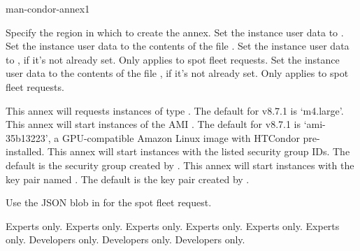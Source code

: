 \begin{ManPage}{}{man-condor-annex}{1}
\begin{Options}
		{Specify the region in which to create the annex.}
		{Set the instance user data to .}
		{Set the instance user data to the contents of the file .}
		{Set the instance user data to , if it's not already set.  Only applies to spot fleet requests.}
		{Set the instance user data to the contents of the file , if it's not already set.  Only applies to spot fleet requests.}

		{This annex will requests instances of type .  The default for v8.7.1 is `m4.large'.}
		{This annex will start instances of the AMI .  The default for v8.7.1 is `ami-35b13223', a GPU-compatible Amazon Linux image with HTCondor pre-installed.}
		{This annex will start instances with the listed security group IDs.  The default is the security group created by .}
		{This annex will start instances with the key pair named .  The default is the key pair created by .}

		{Use the JSON blob in  for the spot fleet request.}

	 {Experts only.}
	 {Experts only.}
	 {Experts only.}
	 {Experts only.}
	 {Experts only.}
	 {Experts only.}
	 {Developers only.}
	 {Developers only.}
	 {Developers only.}
\end{Options}


\end{ManPage}
